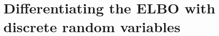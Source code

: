 \documentclass{article} %
\begin{document}
\begin{comment}
Our approach differs from a variational autoencoder in the grouping of the loss function.  Variational autoencoders efficiently backpropagate gradients of the loss function when the approximating posterior $q(z|x)$ consists of a differentiable, deterministic function of the combination of the inputs, the parameters, and a set of input- and parameter-independent random variables.  For instance, given a Gaussian distribution with mean and variance determined by the input, 
\begin{equation*}
\mathcal{N}\left(m(x), v(x) \right) \sim m(x) + \sqrt{v(x)} \cdot \mathcal{N}\left(0, 1 \right) .
\end{equation*}
In contrast, a comparable formulation is not possible for the distribution of equation~\ref{D-Wave-distribution}, implemented by the D-Wave~3.  
\end{comment}





\appendix

\section{Differentiating the ELBO with discrete random variables}





\end{document}
